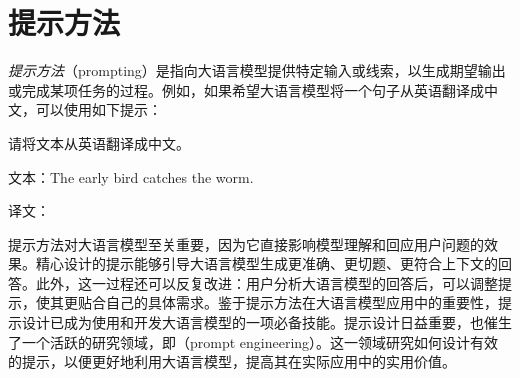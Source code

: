 
%




\chapter{提示方法}

\thispagestyle{chapterurl} %

\noindent \textit{提示方法}（prompting）是指向大语言模型提供特定输入或线索，以生成期望输出或完成某项任务的过程。例如，如果希望大语言模型将一个句子从英语翻译成中文，可以使用如下提示：

\vspace{0.5em}
\begin{tcolorbox}
\hspace{2em} 请将文本从英语翻译成中文。

\vspace{0.2cm}

\hspace{2em} 文本：The early bird catches the worm.

\vspace{0.2cm}

\hspace{2em} 译文：\underline{\hspace{2em}}
\end{tcolorbox}
\vspace{0.5em}

\noindent 提示方法对大语言模型至关重要，因为它直接影响模型理解和回应用户问题的效果。精心设计的提示能够引导大语言模型生成更准确、更切题、更符合上下文的回答。此外，这一过程还可以反复改进：用户分析大语言模型的回答后，可以调整提示，使其更贴合自己的具体需求。鉴于提示方法在大语言模型应用中的重要性，提示设计已成为使用和开发大语言模型的一项必备技能。提示设计日益重要，也催生了一个活跃的研究领域，即（prompt engineering）。这一领域研究如何设计有效的提示，以便更好地利用大语言模型，提高其在实际应用中的实用价值。


